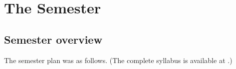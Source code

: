 \documentclass{article}
\begin{document}
\section{The Semester}

\begin{comment}
Three problems were evident before the semester began.

First, what is software design, anyway? The term is highly ambiguous.
Different experts hold radically different conceptions, from
James Reeves' view that ``the source code is the
design''\cite{reeves1992software} to IEEE~1016--2009, which specifies
12~``design viewpoints'', each with its own design entities, design
relationships, and design attributes, to be described in a design language
such as UML\cite{IEEE1016-2009}. The number of aspects or elements of software
design is mind-boggling, and each comes with its own opinionated camps and
controversies: high-level design, low-level design, system design, interface
design (which can mean user-interface design, interaction design,
communication protocols, or class method signatures, depending on who's
talking), database design, architectural design, GoF design patterns, ways of
organizing source code into subroutines, and more.

The sea of ambiguity and opinion surrounding ``software design''

Solution: I took the union of all theories of design, and announced on
the first day that the entire field of software design is a matter of
opinion (including this very statement). %


\end{comment}

\subsection{Semester overview}

The semester plan was as follows. (The complete syllabus is available at
\cite{kovitz2025cs356syllabus}.)
\end{document}
